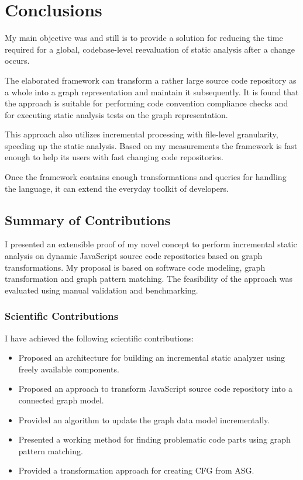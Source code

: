 \chapter{Conclusions}
\label{chap:conclusions}

My main objective was and still is to provide a solution for reducing the time required for a global, codebase-level reevaluation of static analysis after a change occurs.

The elaborated framework can transform a rather large source code repository as a whole into a graph representation and maintain it subsequently. It is found that the approach is suitable for performing code convention compliance checks and for executing static analysis tests on the graph representation.

This approach also utilizes incremental processing with file-level granularity, speeding up the static analysis. Based on my measurements the framework is fast enough to help its users with fast changing code repositories.

Once the framework contains enough transformations and queries for handling the language, it can extend the everyday toolkit of developers.

\section{Summary of Contributions}
I presented an extensible proof of my novel concept to perform incremental static analysis on dynamic JavaScript source code repositories based on graph transformations. My proposal is based on software code modeling, graph transformation and graph pattern matching. The feasibility of the approach was evaluated using manual validation and benchmarking.

\subsection{Scientific Contributions}
I have achieved the following scientific contributions:

\begin{itemize}[topsep=0pt]
	\item Proposed an architecture for building an incremental static analyzer using freely available components.
	\item Proposed an approach to transform JavaScript source code repository into a connected graph model.
	\item Provided an algorithm to update the graph data model incrementally.
	\item Presented a working method for finding problematic code parts using graph pattern matching.
	\item Provided a transformation approach for creating CFG from ASG.
\end{itemize}

